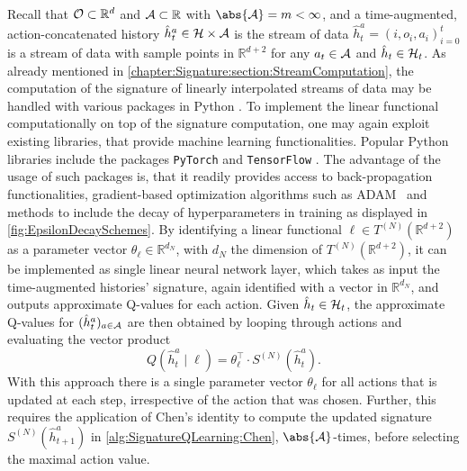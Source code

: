 \documentclass[
    a4paper,
    11pt,
    bibliography=totoc,
    listof=totoc,      
    headinclude=true,
    cleardoublepage=empty,
]{scrbook}
\theoremstyle{plain}
\theoremstyle{definition}
\theoremstyle{remark}
\newcommand{\SetR}{\mathbb R}
\newcommand{\SpaceA}{{\cal A}}
\newcommand{\SpaceO}{{\cal O}}
\newcommand{\SpaceH}{{\cal H}}
\begin{document}
Recall that $\SpaceO\subset\SetR^d$ and $\SpaceA\subset\SetR$ with 
$\abs{\SpaceA} = m < \infty$, and a time-augmented, action-concatenated history $\hat h_t^a\in\SpaceH\times\SpaceA$ is the stream of data
$\hat{h}^a_t = (i, o_i, a_i)_{i=0}^t$ is a stream of data with sample points
in $\SetR^{d+2}$ for any $a_t \in \SpaceA$ and $\hat{h}_t\in\SpaceH_t$.
As already mentioned in \cref{chapter:Signature:section:StreamComputation}, the
computation of the signature of linearly interpolated streams of data may be
handled with various packages in Python
\cite{kidger2021_sdcsltb, lyons2002_esig, reizenstein2020_a1ileciss}. To
implement the linear functional computationally on top of the signature
computation, one may again exploit existing libraries, that provide machine
learning functionalities. Popular Python libraries include the packages
\texttt{PyTorch} \cite{paszke2017_adp} and \texttt{TensorFlow}
\cite{martinabadi2015_tlmlhs}. The advantage of the usage of such packages is,
that it readily provides access to back-propagation functionalities, 
gradient-based optimization algorithms such as ADAM~\cite{kingma2015_amso} and
methods to include the decay of hyperparameters in training as displayed in
\cref{fig:EpsilonDecaySchemes}. By identifying a linear
functional $\ell\in T^{(N)}(\SetR^{d+2})$ as a parameter vector $\theta_\ell
\in \SetR^{d_N}$, with $d_N$ the dimension of $T^{(N)}(\SetR^{d+2})$, it can
be implemented as single linear neural network layer, which takes as input the
time-augmented histories' signature, again identified with a vector in 
$\SetR^{d_N}$, and outputs approximate Q-values for each action. Given 
$\hat{h}_t\in\SpaceH_t$, the approximate Q-values for $(\hat h_t^a)_{a \in 
\SpaceA}$ are then obtained by looping through actions and evaluating the 
vector product
\[
    Q(\hat{h}^a_t\mid \ell) = \theta_\ell^\top \cdot S^{(N)}(\hat{h}^a_t).
\]
With this approach there is a single parameter vector $\theta_\ell$ for all 
actions that is updated at each step, irrespective of the action that was 
chosen. Further, this requires the application of Chen's identity to compute 
the updated signature $S^{(N)}(\hat{h}^a_{t+1})$ in 
\cref{alg:SignatureQLearning:Chen}, $\abs{\SpaceA}$-times, before selecting 
the maximal action value.
\end{document}

